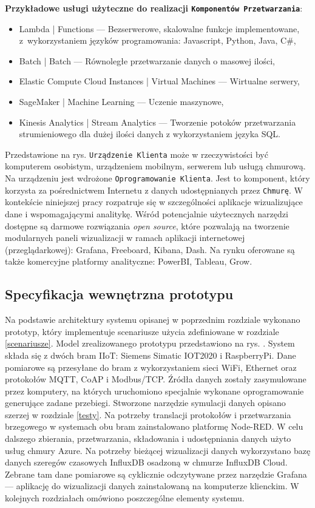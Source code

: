 \documentclass[a4paper, 12pt, twoside]{article}
\begin{document}
\noindent\textbf{Przykładowe usługi użyteczne do realizacji \texttt{Komponentów Przetwarzania}}:
\begin{itemize}
      \itemsep0em
      \item Lambda | Functions --- Bezserwerowe, skalowalne funkcje implementowane,
            z~wykorzystaniem języków programowania: Javascript, Python, Java, C\#,
      \item Batch | Batch --- Równoległe przetwarzanie danych o masowej ilości,
      \item Elastic Compute Cloud Instances | Virtual Machines --- Wirtualne
            serwery,
      \item SageMaker | Machine Learning --- Uczenie maszynowe,
      \item Kinesis Analytics | Stream Analytics --- Tworzenie potoków przetwarzania
            strumieniowego dla dużej ilości danych z wykorzystaniem języka SQL.
\end{itemize}

Przedstawione na rys.  \texttt{Urządzenie Klienta} może w rzeczywistości
być komputerem osobistym, urządzeniem mobilnym, serwerem lub usługą chmurową.
Na urządzeniu jest wdrożone \texttt{Oprogramowanie Klienta}. Jest to komponent, który
korzysta za pośrednictwem Internetu z danych udostępnianych przez \texttt{Chmurę}.
W kontekście niniejszej pracy rozpatruje się w szczególności
aplikacje wizualizujące dane i wspomagającymi analitykę. Wśród potencjalnie
użytecznych narzędzi dostępne są darmowe rozwiązania \emph{open source}, które
pozwalają na tworzenie modularnych paneli wizualizacji w ramach
aplikacji internetowej (przeglądarkowej): Grafana,
Freeboard, Kibana, Dash. Na rynku oferowane są także komercyjne platformy analityczne:
PowerBI, Tableau, Grow.

\subsection{Specyfikacja wewnętrzna prototypu}

Na podstawie architektury systemu opisanej w poprzednim rozdziale wykonano
prototyp, który implementuje scenariusze użycia zdefiniowane w rozdziale \ref{scenariusze}.
Model zrealizowanego prototypu przedstawiono na rys. .
System składa się z dwóch bram IIoT: Siemens Simatic IOT2020 i RaspberryPi.
Dane pomiarowe są przesyłane do bram z wykorzystaniem sieci WiFi, Ethernet
oraz protokołów MQTT, CoAP i Modbus/TCP. Źródła danych 
zostały zasymulowane przez komputery, na których uruchomiono specjalnie wykonane oprogramowanie
generujące zadane przebiegi. Stworzone narzędzie symulacji danych opisano szerzej w rozdziale
\ref{testy}. Na potrzeby translacji protokołów
i przetwarzania brzegowego w systemach obu bram zainstalowano platformę Node-RED.
W celu dalszego zbierania, przetwarzania, składowania i udostępniania danych
użyto usług chmury Azure. Na potrzeby bieżącej wizualizacji danych wykorzystano
bazę danych szeregów czasowych InfluxDB osadzoną w chmurze InfluxDB Cloud.
Zebrane tam dane pomiarowe są cyklicznie odczytywane przez narzędzie Grafana ---
aplikację do wizualizacji danych zainstalowaną na komputerze klienckim.
W kolejnych rozdziałach omówiono poszczególne elementy systemu.
\end{document}
